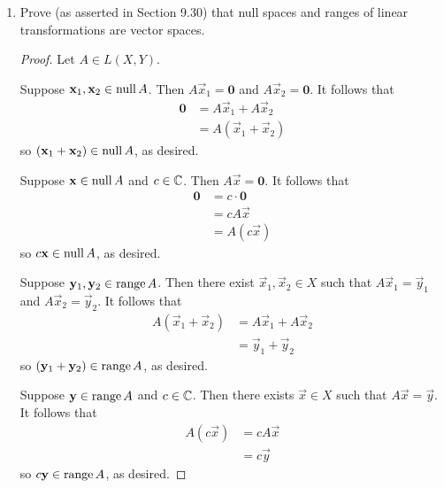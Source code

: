 \documentclass[../psets.tex]{subfiles}
\begin{document}
\begin{enumerate}[label={\textbf{\arabic*.}}]
    \begin{proof}
        If we suppose that $A\vec{x}=A\vec{y}$, then by linearity,
        \begin{align*}
            \bm{0} &= A\vec{x}-A\vec{y}\\
            &= A(\vec{x}-\vec{y})
        \end{align*}
        It follows by hypothesis that $\vec{x}-\vec{y}=\bm{0}$, hence $\vec{x}=\vec{y}$, proving that $A$ is 1-1, as desired.
    \end{proof}
    \item Prove (as asserted in Section 9.30) that null spaces and ranges of linear transformations are vector spaces.
    \begin{proof}
        Let $A\in L(X,Y)$.\par\medskip
        Suppose $\mathbf{x}_1,\mathbf{x}_2\in\operatorname{null} A$. Then $A\vec{x}_1=\bm{0}$ and $A\vec{x}_2=\bm{0}$. It follows that
        \begin{align*}
            \bm{0} &= A\vec{x}_1+A\vec{x}_2\\
            &= A(\vec{x}_1+\vec{x}_2)
        \end{align*}
        so $(\mathbf{x}_1+\mathbf{x}_2)\in\operatorname{null} A$, as desired.\par
        Suppose $\mathbf{x}\in\operatorname{null} A$ and $c\in\mathbb{C}$. Then $A\vec{x}=\bm{0}$. It follows that
        \begin{align*}
            \bm{0} &= c\cdot\bm{0}\\
            &= cA\vec{x}\\
            &= A(c\vec{x})
        \end{align*}
        so $c\mathbf{x}\in\operatorname{null} A$, as desired.\par\smallskip
        Suppose $\mathbf{y}_1,\mathbf{y}_2\in\operatorname{range} A$. Then there exist $\vec{x}_1,\vec{x}_2\in X$ such that $A\vec{x}_1=\vec{y}_1$ and $A\vec{x}_2=\vec{y}_2$. It follows that
        \begin{align*}
            A(\vec{x}_1+\vec{x}_2) &= A\vec{x}_1+A\vec{x}_2\\
            &= \vec{y}_1+\vec{y}_2
        \end{align*}
        so $(\mathbf{y}_1+\mathbf{y}_2)\in\operatorname{range} A$, as desired.\par
        Suppose $\mathbf{y}\in\operatorname{range} A$ and $c\in\mathbb{C}$. Then there exists $\vec{x}\in X$ such that $A\vec{x}=\vec{y}$. It follows that
        \begin{align*}
            A(c\vec{x}) &= cA\vec{x}\\
            &= c\vec{y}
        \end{align*}
        so $c\mathbf{y}\in\operatorname{range} A$, as desired.
    \end{proof}
\end{enumerate}
\end{document}
